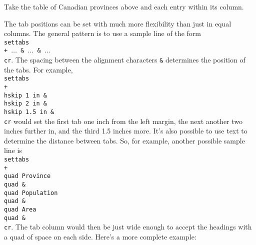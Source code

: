 \exercise Take the table of Canadian provinces above and \centre{} each 
entry within its column. 
 
The tab positions can be set with much more flexibility than just 
in equal columns.  The general pattern is to use a sample line of 
the form {\tt \\settabs \\+ $\ldots$ \& $\ldots$ \& $\ldots$ \\cr}. 
The spacing between the alignment characters {\tt \&} 
determines the position of the tabs.  For example, {\tt \\settabs 
\\+ \\hskip 1 in \& \\hskip 2 in \& \\hskip 1.5 in \& \\cr} would 
set the first tab one inch from the left margin, the next another 
two inches further in, and the third 1.5 inches more.  It's also 
possible to use text to determine the distance between tabs. So, 
for example, another possible sample line is 
{\tt \\settabs \\+ \\quad Province \\quad \& \\quad Population \\quad 
\& \\quad Area \\quad \& \\cr}. 
The tab column would then be just wide enough to accept the headings 
with a quad of space on each side.  Here's a more complete example: 
 
